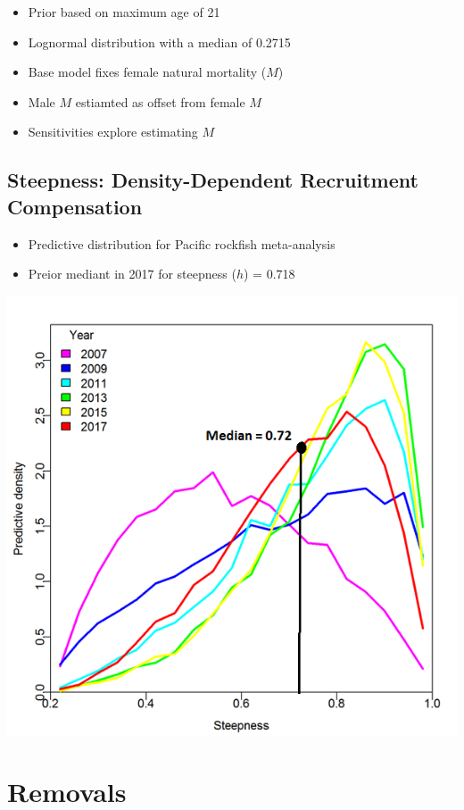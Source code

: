 \documentclass[ignorenonframetext,compress]{beamer}
\providecommand{\tightlist}{%
\setlength{\itemsep}{0pt}\setlength{\parskip}{0pt}}
\begin{document}
\begin{itemize}
\tightlist
\item
  Prior based on maximum age of 21
\item
  Lognormal distribution with a median of 0.2715
\item
  Base model fixes female natural mortality (\(M\))
\item
  Male \(M\) estiamted as offset from female \(M\)
\item
  Sensitivities explore estimating \(M\)
\end{itemize}

\subsection{Steepness: Density-Dependent Recruitment
Compensation}\label{steepness-density-dependent-recruitment-compensation}

\begin{itemize}
\tightlist
\item
  Predictive distribution for Pacific rockfish meta-analysis
\item
  Preior mediant in 2017 for steepness (\(h\)) = 0.718
\end{itemize}

\includegraphics{Figures/h_prior.png}

\section{Removals}\label{removals}
\end{document}
